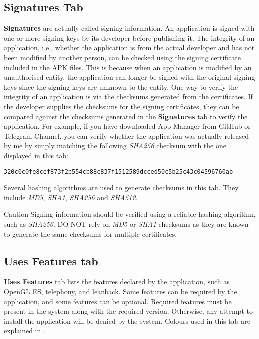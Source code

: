 \subsection{Signatures Tab}\label{subsec:signatures-tab} %
\textbf{Signatures} are actually called signing information. An application is signed with one or
more signing keys by its developer before publishing it. The integrity of an application, i.e.,
whether the application is from the actual developer and has not been modified by another person,
can be checked using the signing certificate included in the APK files. This is because when an
application is modified by an unauthorised entity, the application can longer be signed with the
original signing keys since the signing keys are unknown to the entity. One way to verify the
integrity of an application is via the checksums generated from the certificates. If the developer
supplies the checksums for the signing certificates, they can be compared against the checksums
generated in the \textbf{Signatures} tab to verify the application. For example, if you have
downloaded App Manager from GitHub or Telegram Channel, you can verify whether the application was
actually released by me by simply matching the following \textit{SHA256} checksum with the one
displayed in this tab:
\begin{Verbatim}
320c0c0fe8cef873f2b554cb88c837f1512589dcced50c5b25c43c04596760ab
\end{Verbatim}

Several hashing algorithms are used to generate checksums in this tab. They include \textit{MD5}, \textit{SHA1},
\textit{SHA256} and \textit{SHA512}.

\begin{danger}{Caution}
    Signing information should be verified using a reliable hashing algorithm, such as \textit{SHA256}.
    DO NOT rely on \textit{MD5} or \textit{SHA1} checksums as they are known to generate the same
    checksums for multiple certificates.
\end{danger}

\subsection{Uses Features tab}\label{subsec:uses-features-tab} %
\textbf{Uses Features} tab lists the features declared by the application, such as OpenGL ES,
telephony, and leanback. Some features can be required by the application, and some features can be
optional. Required features must be present in the system along with the required version.
Otherwise, any attempt to install the application will be denied by the system. Colours used in this
tab are explained in .

